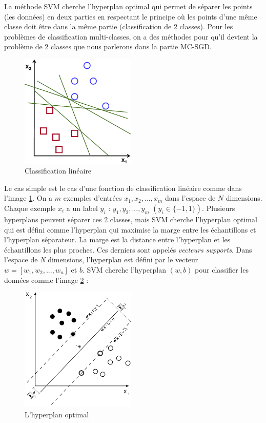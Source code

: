 La méthode SVM cherche l'hyperplan optimal qui permet de séparer les points (les données) en deux parties en respectant le principe où les points d'une même classe doit être dans la même partie (classification de 2 classes). Pour les problèmes de classification multi-classes, on a des méthodes pour qu'il devient la problème de 2 classes que nous parlerons dans la partie MC-SGD.
\begin{figure}[ht!]
\centering
\includegraphics[width=55mm]{images/separating_lines}
\caption{Classification linéaire}
\label{slines}
\end{figure}

Le cas simple est le cas d'une fonction de classification linéaire comme dans l'image \ref{slines}. On a $m$ exemples d'entrées $x_1, x_2, ..., x_m$ dans l'espace de $N$ dimensions. Chaque exemple $x_i$ a un label $y_i$ : $y_1, y_2, ..., y_m$ $(y_i \in \{-1,1\})$. Plusieurs hyperplans peuvent séparer ces 2 classes, mais SVM cherche l'hyperplan optimal qui est défini comme l'hyperplan qui maximise la marge entre les échantillons et l'hyperplan séparateur. La marge est la distance entre l'hyperplan et les échantillons les plus proches. Ces derniers sont appelés \textit{vecteurs supports}. Dans l'espace de \textit{N} dimensions, l'hyperplan est défini par le vecteur $w=[w_1,w_2,...,w_n]$ et $b$. SVM cherche l'hyperplan $(w, b)$ pour classifier les données comme l'image \ref{max_margin} :

\begin{figure}[ht!]
\centering
\includegraphics[width=55mm]{images/margin}
\caption{L'hyperplan optimal}
\label{max_margin}
\end{figure}

